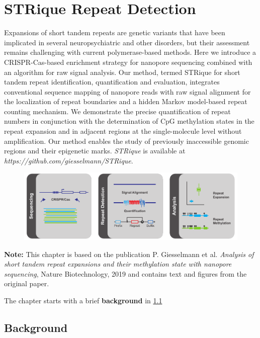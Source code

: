 \chapter{STRique Repeat Detection}
\label{cha:strique}

Expansions of short tandem repeats are genetic variants that have been implicated in several neuropsychiatric and other disorders, but their assessment remains challenging with current polymerase-based methods. Here we introduce a CRISPR-Cas-based enrichment strategy for nanopore sequencing combined with an algorithm for raw signal analysis. Our method, termed STRique for short tandem repeat identification, quantification and evaluation, integrates conventional sequence mapping of nanopore reads with raw signal alignment for the localization of repeat boundaries and a hidden Markov model-based repeat counting mechanism. We demonstrate the precise quantification of repeat numbers in conjunction with the determination of CpG methylation states in the repeat expansion and in adjacent regions at the single-molecule level without amplification. Our method enables the study of previously inaccessible genomic regions and their epigenetic marks. \textit{STRique} is available at \textit{https://github.com/giesselmann/STRique}.

\begin{figure}[h]
    \centering
    \includegraphics[width=1.0\textwidth]{figures/strique/GA.pdf}
    \label{fig:strique:ga}
\end{figure}

\textbf{Note:} This chapter is based on the publication P. Giesselmann et al. \textit{Analysis of short tandem repeat expansions and their methylation state with nanopore sequencing}, Nature Biotechnology, 2019 and contains text and figures from the original paper.

The chapter starts with a brief \textbf{background} in \ref{sec:strique:background}




\section{Background}
\label{sec:strique:background}

